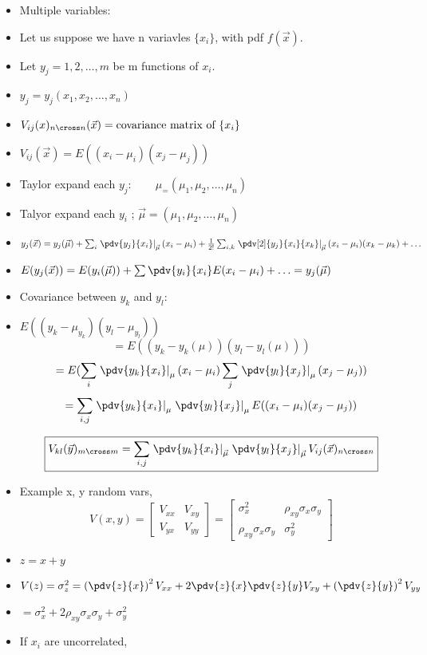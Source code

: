\begin{itemize}
    \item Multiple variables:
    \item Let us suppose we have n variavles $\{ x_i \}$, with pdf $f(\vec{x})$.
    \item Let $y_j = 1, 2, \ldots, m$ be m functions of $x_i$.
    \item $y_j = y_j(x_1, x_2, \ldots, x_n)$
    \item $V_{ij}(x)_{n \cross n}(\vec{x}) = \text{covariance matrix of } \{x_i\}$
    \item $V_{ij}(\vec{x}) = E((x_i - \mu_i)(x_j - \mu_j))$
    \item Taylor expand each $y_j: \qquad \mu_=(\mu_1, \mu_2, \ldots, \mu_n)$
    \item Talyor expand each $y_i$ ; $\vec{\mu} = (\mu_1, \mu_2, \ldots, \mu_n)$
    \item $y_j(\vec{x}) = y_j(\vec{\mu}) + \sum_i \left. \pdv{y_j}{x_i} \right|_{\vec{\mu}} (x_i - \mu_i) + \frac{1}{2!} \sum_{i,k} \left. \pdv[2]{y_j}{x_i}{x_k} \right|_{\vec{\mu}} (x_i - \mu_i)(x_k - \mu_k) + \ldots$
    \item $E(y_j(\vec{x})) = E(y_{i}(\vec{\mu})) + \sum \pdv{y_i}{x_i} E(x_i - \mu_i) + \ldots = y_j(\vec{\mu})$
    \item Covariance between $y_k$ and $y_l$:
    \item $E((y_k - \mu_{y_k})(y_l - \mu_{y_l}))$
    \[ = E((y_k-y_k(\mu))(y_l - y_l(\mu))) \]
    \[ = E(\sum_i \left. \pdv{y_k}{x_i}\right|_{\mu} (x_i - \mu_i) \sum_j \left. \pdv{y_l}{x_j}\right|_{\mu} (x_j - \mu_j)) \]
    \[ = \sum_{i,j} \left. \pdv{y_k}{x_i}\right|_{\mu}  \left. \pdv{y_l}{x_j} \right|_{\mu} E((x_i - \mu_i)(x_j - \mu_j)) \]

    \[ \boxed{ V_{kl}(\vec{y})_{m \cross m} = \sum_{i,j} \left. \pdv{y_k}{x_i}\right|_{\vec{\mu}}  \left. \pdv{y_l}{x_j} \right|_{\vec{\mu}} V_{ij}(\vec{x})_{n \cross n} }\]

    \item Example x, y random vars,
    \[ V(x,y) = \begin{bmatrix}
        V_{xx} & V_{xy} \\
        V_{yx} & V_{yy}
    \end{bmatrix} = \begin{bmatrix}
        \sigma_x^2 & \rho_{xy} \sigma_x \sigma_y \\
        \rho_{xy} \sigma_x \sigma_y & \sigma_y^2
    \end{bmatrix} \]
    \item $z = x + y$
    \item $V(z) = \sigma_z^2 = \left(\pdv{z}{x} \right)^2 V_{xx} + 2  \pdv{z}{x} \pdv{z}{y} V_{xy} + \left(\pdv{z}{y} \right)^2 V_{yy}$
    \item $ = \sigma_x^2 + 2 \rho_{xy} \sigma_x \sigma_y + \sigma_y^2$
    \item If $x_i$ are uncorrelated,
    

\end{itemize}
